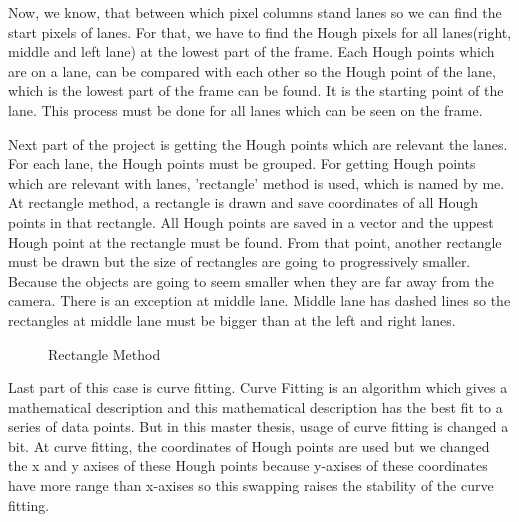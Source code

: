 Now, we know, that between which pixel columns stand lanes so we can find the start pixels of lanes. For that, we have to find the Hough pixels for all lanes(right, middle and left lane) at the lowest part of the frame. Each Hough points which are on a lane, can be compared with each other so the Hough point of the lane, which is the lowest part of the frame can be found. It is the starting point of the lane. This process must be done for all lanes which can be seen on the frame.

Next part of the project is getting the Hough points which are relevant the lanes. For each lane, the Hough points must be grouped. For getting Hough points which are relevant with lanes, 'rectangle' method is used, which is named by me. At rectangle method, a rectangle is drawn and save coordinates of all Hough points in that rectangle. All Hough points are saved in a vector and the uppest Hough point at the rectangle must be found. From that point, another rectangle must be drawn but the size of rectangles are going to progressively smaller. Because the objects are going to seem smaller when they are far away from the camera. There is an exception at middle lane. Middle lane has dashed lines so the rectangles at middle lane must be bigger than at the left and right lanes.

\begin{figure}[H]
  \centering
  \caption{Rectangle Method}
\end{figure} 

Last part of this case is curve fitting. Curve Fitting is an algorithm which gives a mathematical description and this mathematical description has the best fit to a series of data points. But in this master thesis, usage of curve fitting is changed a bit. At curve fitting, the coordinates of Hough points are used but we changed the x and y axises of these Hough points because y-axises of these coordinates have more range than x-axises so this swapping raises the stability of the curve fitting.

